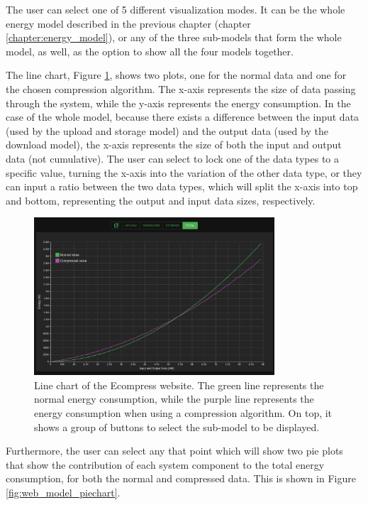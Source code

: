         The user can select one of 5 different visualization modes. It can be the whole energy model described in the previous chapter (chapter \ref{chapter:energy_model}), or any of the three sub-models that form the whole model, as well, as the option to show all the four models together. 

        The line chart, Figure \ref{fig:web_model_linechart}, shows two plots, one for the normal data and one for the chosen compression algorithm. The x-axis represents the size of data passing through the system, while the y-axis represents the energy consumption. In the case of the whole model, because there exists a difference between the input data (used by the upload and storage model) and the output data (used by the download model), the x-axis represents the size of both the input and output data (not cumulative). The user can select to lock one of the data types to a specific value, turning the x-axis into the variation of the other data type, or they can input a ratio between the two data types, which will split the x-axis into top and bottom, representing the output and input data sizes, respectively.
        
        \begin{figure}[H]
            \centering
            \includegraphics[width=0.8\textwidth]{figs/web_model_linechart.png}
            \caption[Line chart of the Ecompress website.] {Line chart of the Ecompress website. The green line represents the normal energy consumption, while the purple line represents the energy consumption when using a compression algorithm. On top, it shows a group of buttons to select the sub-model to be displayed.}
            \label{fig:web_model_linechart}
        \end{figure}
        
        Furthermore, the user can select any that point which will show two pie plots that show the contribution of each system component to the total energy consumption, for both the normal and compressed data. This is shown in Figure \ref{fig:web_model_piechart}.

